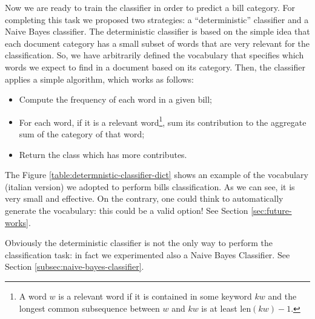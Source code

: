 \documentclass[10pt,twocolumn,letterpaper]{article}
\begin{document}
Now we are ready to train the classifier in order to predict a bill
category. For completing this task we proposed two strategies: a
``deterministic'' classifier and a Naive Bayes classifier. The
deterministic classifier is based on the simple idea that each
document category has a small subset of words that are very relevant
for the classification. So, we have arbitrarily defined the vocabulary
that specifies which words we expect to find in a document based on
its category. Then, the classifier applies a simple algorithm, which
works as follows:

\begin{itemize}
  \item Compute the frequency of each word in a given bill;
  \item For each word, if it is a relevant word\footnote{A word $w$ is
    a relevant word if it is contained in some keyword $kw$ and the
    longest common subsequence between $w$ and $kw$ is at least
    $\mathrm{len}(kw) - 1$.}, sum its contribution to the aggregate
    sum of the category of that word;
  \item Return the class which has more contributes.
\end{itemize}

The Figure \ref{table:determnistic-classifier-dict} shows an example
of the vocabulary (italian version) we adopted to perform bills
classification. As we can see, it is very small and effective.  On the
contrary, one could think to automatically generate the vocabulary:
this could be a valid option! See Section \ref{sec:future-works}.

Obviously the deterministic classifier is not the only way to perform
the classification task: in fact we experimented also a Naive Bayes
Classifier. See Section \ref{subsec:naive-bayes-classifier}.
\end{document}
